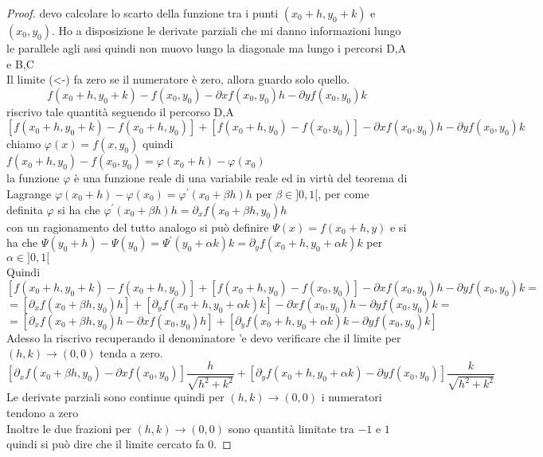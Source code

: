 \begin{proof}
	devo calcolare lo scarto della funzione tra i punti $(x_0+h,y_0+k)$ e $(x_0,y_0)$. Ho a disposizione le derivate parziali che mi danno informazioni lungo le parallele agli assi quindi non muovo lungo la diagonale ma lungo i percorsi D,A e B,C\\
	Il limite  (<-) fa zero se il numeratore è zero, allora guardo solo quello.\\
	$$f(x_0+h,y_0+k) -f(x_0,y_0)- \partial{x}f(x_0,y_0)h - \partial{y}f(x_0,y_0)k$$
	riscrivo tale quantità seguendo il percorso D,A
	$$ [f(x_0+h,y_0+k) - f(x_0+h,y_0)] + [f(x_0+h,y_0) - f(x_0,y_0)] - \partial{x}f(x_0,y_0)h - \partial{y}f(x_0,y_0)k$$
	chiamo $\varphi (x) = f(x,y_0)$ quindi $f(x_0+h,y_0)-f(x_0,y_0) = \varphi (x_0+h)-\varphi (x_0)$\\
	la funzione $\varphi $ è una funzione reale di una variabile reale ed in virtù del teorema di Lagrange $\varphi (x_0+h)-\varphi (x_0) = \varphi^{'}(x_0 + \beta h)h$ per $\beta\in ]0,1[ $, per come definita $\varphi$ si ha che $\varphi^{'}(x_0 + \beta h)h = \partial_{x}f(x_0+\beta h,y_0)h$\\
	con un ragionamento del tutto analogo si può definire $\varPsi (x) = f(x_0+h,y)$ e si ha che $\varPsi (y_0+h)-\varPsi (y_0) = \varPsi^{'}(y_0 + \alpha k)k = \partial_{y}f(x_0+h,y_0+\alpha k)k$ per $\alpha\in ]0,1[ $\\
	Quindi
	$$ [f(x_0+h,y_0+k) - f(x_0+h,y_0)] + [f(x_0+h,y_0) - f(x_0,y_0)] - \partial{x}f(x_0,y_0)h - \partial{y}f(x_0,y_0)k = $$
	$$= [\partial_{x}f(x_0+\beta h,y_0)h] + [\partial_{y}f(x_0+h,y_0+\alpha k)k] - \partial{x}f(x_0,y_0)h - \partial{y}f(x_0,y_0)k = $$
	$$= [\partial_{x}f(x_0+\beta h,y_0)h - \partial{x}f(x_0,y_0)h] + [\partial_{y}f(x_0+h,y_0+\alpha k)k  - \partial{y}f(x_0,y_0)k] $$
	Adesso la riscrivo recuperando il denominatore 	'e devo verificare che il limite per $(h,k)\rightarrow (0,0)$ tenda a zero.\\
	
	$$[\partial_{x}f(x_0+\beta h,y_0)-\partial{x}f(x_0,y_0)] \frac{h}{\sqrt{h^2+k^2}} + [\partial_{y}f(x_0+h,y_0+\alpha k) - \partial{y}f(x_0,y_0)]\frac{k}{\sqrt{h^2+k^2}} $$
	Le derivate parziali sono continue quindi per $(h,k)\rightarrow (0,0)$ i numeratori tendono a zero\\
	Inoltre le due frazioni per $(h,k)\rightarrow (0,0)$ sono quantità limitate tra $-1$ e $1$ quindi si può dire che il limite cercato fa 0.
\end{proof}


